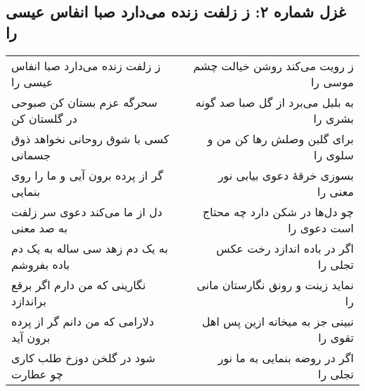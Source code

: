\begin{center}
\section*{غزل شماره ۲: ز زلفت زنده می‌دارد صبا انفاس عیسی را}
\label{sec:002}
\begin{longtable}{l p{0.5cm} r}
ز زلفت زنده می‌دارد صبا انفاس عیسی را
&&
ز رویت می‌کند روشن خیالت چشم موسی را
\\
سحرگه عزم بستان کن صبوحی در گلستان کن
&&
به بلبل می‌برد از گل صبا صد گونه بشری را
\\
کسی با شوق روحانی نخواهد ذوق جسمانی
&&
برای گلبن وصلش رها کن من و سلوی را
\\
گر از پرده برون آیی و ما را روی بنمایی
&&
بسوزی خرقهٔ دعوی بیابی نور معنی را
\\
دل از ما می‌کند دعوی سر زلفت به صد معنی
&&
چو دل‌ها در شکن دارد چه محتاج است دعوی را
\\
به یک دم زهد سی ساله به یک دم باده بفروشم
&&
اگر در باده اندازد رخت عکس تجلی را
\\
نگارینی که من دارم اگر برقع براندازد
&&
نماید زینت و رونق نگارستان مانی را
\\
دلارامی که من دانم گر از پرده برون آید
&&
نبینی جز به میخانه ازین پس اهل تقوی را
\\
شود در گلخن دوزخ طلب کاری چو عطارت
&&
اگر در روضه بنمایی به ما نور تجلی را
\\
\end{longtable}
\end{center}
